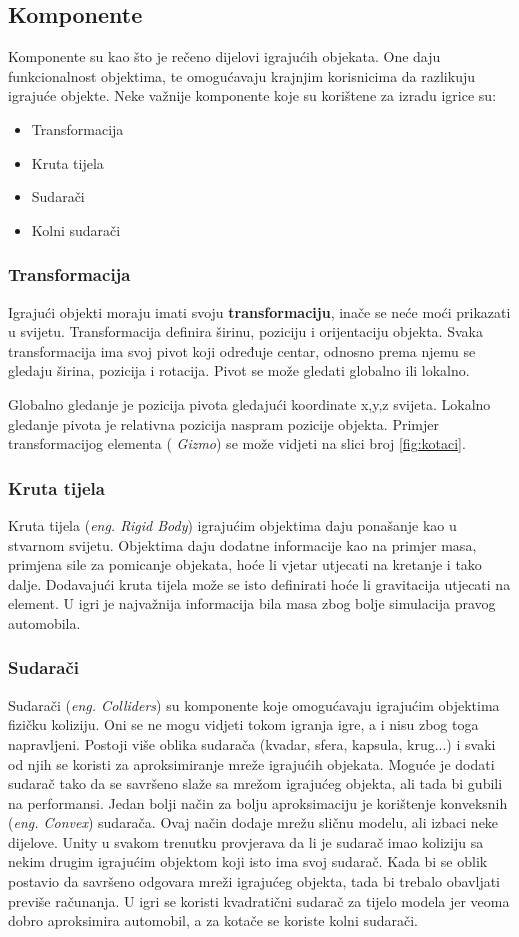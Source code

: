 \subsection{Komponente}
Komponente su kao što je rečeno dijelovi igrajućih objekata. One daju funkcionalnost objektima, te omogućavaju krajnjim korisnicima da razlikuju igrajuće objekte. Neke važnije komponente koje su korištene za izradu igrice su:
\newpage
\begin{itemize} 
	\item Transformacija
	\item Kruta tijela
	\item Sudarači
	\item Kolni sudarači 
\end{itemize}
\subsubsection{Transformacija}
Igrajući objekti moraju imati svoju \textbf{transformaciju}, inače se neće moći prikazati u svijetu. Transformacija definira širinu, poziciju i orijentaciju objekta. Svaka transformacija ima svoj pivot koji određuje centar, odnosno prema njemu se gledaju širina, pozicija i rotacija. Pivot se može gledati globalno ili lokalno. \par 
Globalno gledanje je pozicija pivota gledajući koordinate x,y,z svijeta. Lokalno gledanje pivota je relativna pozicija naspram pozicije objekta. Primjer transformacijog elementa (\emph{ Gizmo}) se može vidjeti na slici broj \ref{fig:kotaci}.

\subsubsection{Kruta tijela}
Kruta tijela (\emph{eng. Rigid Body}) igrajućim objektima daju ponašanje kao u stvarnom svijetu. Objektima daju dodatne informacije kao na primjer masa, primjena sile za pomicanje objekata, hoće li vjetar utjecati na kretanje i tako dalje. Dodavajući kruta tijela može se isto definirati hoće li gravitacija utjecati na element. U igri je najvažnija informacija bila masa zbog bolje simulacija pravog automobila.
\subsubsection{Sudarači}
Sudarači (\emph{eng. Colliders}) su komponente koje omogućavaju igrajućim objektima fizičku koliziju. Oni se ne mogu vidjeti tokom igranja igre, a i nisu zbog toga napravljeni. Postoji više oblika sudarača (kvadar, sfera, kapsula, krug...) i svaki od njih se koristi za aproksimiranje mreže igrajućih objekata. Moguće je dodati sudarač tako da se savršeno slaže sa mrežom igrajućeg objekta, ali tada bi gubili na performansi. Jedan bolji način za bolju aproksimaciju je korištenje konveksnih (\emph{eng. Convex}) sudarača. Ovaj način dodaje mrežu sličnu modelu, ali izbaci neke dijelove. 
\newpage
Unity u svakom trenutku provjerava da li je sudarač imao koliziju sa nekim drugim igrajućim objektom koji isto ima svoj sudarač. Kada bi se oblik postavio da savršeno odgovara mreži igrajućeg objekta, tada bi trebalo obavljati previše računanja. U igri se koristi kvadratični sudarač za tijelo modela jer veoma dobro aproksimira automobil, a za kotače se koriste kolni sudarači.
